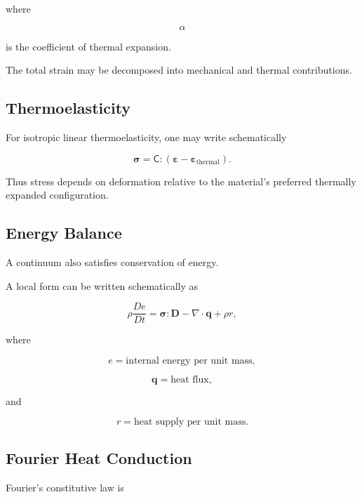 where

\[
\alpha
\]

is the coefficient of thermal expansion.

The total strain may be decomposed into mechanical and thermal contributions.

\subsection{Thermoelasticity}
\label{subsec:thermoelasticity}

For isotropic linear thermoelasticity, one may write schematically

\[
\boxed{
\boldsymbol{\sigma}
=
\mathsf{C}
:
\left(
\boldsymbol{\varepsilon}
-
\boldsymbol{\varepsilon}_{\text{thermal}}
\right).
}
\]

Thus stress depends on deformation relative to the material's preferred
thermally expanded configuration.

\subsection{Energy Balance}
\label{subsec:continuum-energy-balance}

A continuum also satisfies conservation of energy.

A local form can be written schematically as

\[
\boxed{
\rho\frac{De}{Dt}
=
\boldsymbol{\sigma}:\mathbf{D}
-
\nabla\cdot\mathbf{q}
+
\rho r,
}
\]

where

\[
e
=
\text{internal energy per unit mass},
\]

\[
\mathbf{q}
=
\text{heat flux},
\]

and

\[
r
=
\text{heat supply per unit mass}.
\]

\subsection{Fourier Heat Conduction}
\label{subsec:fourier-heat-conduction}

Fourier's constitutive law is

